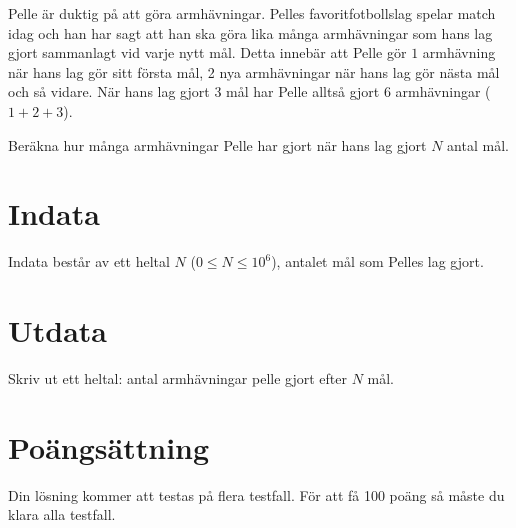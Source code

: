 Pelle är duktig på att göra armhävningar. Pelles favoritfotbollslag spelar match idag och
han har sagt att han ska göra lika många armhävningar som hans lag gjort sammanlagt vid
varje nytt mål. Detta innebär att Pelle gör $1$ armhävning när hans lag gör sitt första mål,
2 nya armhävningar när hans lag gör nästa mål och så vidare. När hans lag gjort $3$ mål har
Pelle alltså gjort $6$ armhävningar ($1+2+3$).

Beräkna hur många armhävningar Pelle har gjort när hans lag gjort $N$ antal mål.

\section*{Indata}
Indata består av ett heltal $N$ ($0 \leq N \leq 10^6$), antalet mål som Pelles lag gjort.

\section*{Utdata}
Skriv ut ett heltal: antal armhävningar pelle gjort efter $N$ mål.

\section*{Poängsättning}
Din lösning kommer att testas på flera testfall. För att få 100 poäng så måste du klara alla testfall.
